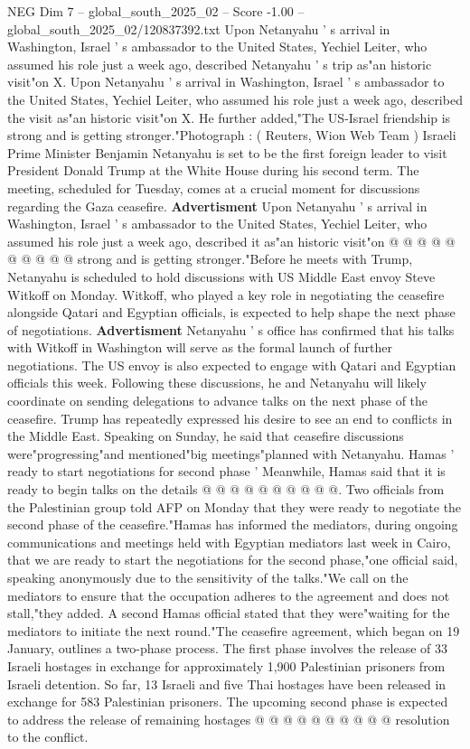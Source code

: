 \begin{textsample}{NEG Dim 7 – global\_south\_2025\_02 – Score -1.00 – global\_south\_2025\_02/120837392.txt}  \label{ex:f7_neg_035}
Upon Netanyahu ' s arrival in Washington, Israel ' s ambassador to the United States, Yechiel Leiter, who assumed his role just a week ago, described Netanyahu ' s trip as"an historic visit"on X.
Upon Netanyahu ' s arrival in Washington, Israel ' s ambassador to the United States, Yechiel Leiter, who assumed his role just a week ago, described the visit as"an historic visit"on X.
He further added,"The US-Israel friendship is strong and is getting stronger."Photograph : ( Reuters, Wion Web Team ) Israeli Prime Minister Benjamin Netanyahu is set to be the first foreign leader to visit President Donald Trump at the White House during his second term.
The meeting, scheduled for Tuesday, comes at a crucial moment for discussions regarding the Gaza ceasefire. \textbf{Advertisment} Upon Netanyahu ' s arrival in Washington, Israel ' s ambassador to the United States, Yechiel Leiter, who assumed his role just a week ago, described it as"an historic visit"on @ @ @ @ @ @ @ @ @ @ strong and is getting stronger."Before he meets with Trump, Netanyahu is scheduled to hold discussions with US Middle East envoy Steve Witkoff on Monday.
Witkoff, who played a key role in negotiating the ceasefire alongside Qatari and Egyptian officials, is expected to help shape the next phase of negotiations. \textbf{Advertisment} Netanyahu ' s office has confirmed that his talks with Witkoff in Washington will serve as the formal launch of further negotiations.
The US envoy is also expected to engage with Qatari and Egyptian officials this week.
Following these discussions, he and Netanyahu will likely coordinate on sending delegations to advance talks on the next phase of the ceasefire.
Trump has repeatedly expressed his desire to see an end to conflicts in the Middle East.
Speaking on Sunday, he said that ceasefire discussions were"progressing"and mentioned"big meetings"planned with Netanyahu.
Hamas ' ready to start negotiations for second phase ' Meanwhile, Hamas said that it is ready to begin talks on the details @ @ @ @ @ @ @ @ @ @.
Two officials from the Palestinian group told AFP on Monday that they were ready to negotiate the second phase of the ceasefire."Hamas has informed the mediators, during ongoing communications and meetings held with Egyptian mediators last week in Cairo, that we are ready to start the negotiations for the second phase,"one official said, speaking anonymously due to the sensitivity of the talks."We call on the mediators to ensure that the occupation adheres to the agreement and does not stall,"they added.
A second Hamas official stated that they were"waiting for the mediators to initiate the next round."The ceasefire agreement, which began on 19 January, outlines a two-phase process.
The first phase involves the release of 33 Israeli hostages in exchange for approximately 1,900 Palestinian prisoners from Israeli detention.
So far, 13 Israeli and five Thai hostages have been released in exchange for 583 Palestinian prisoners.
The upcoming second phase is expected to address the release of remaining hostages @ @ @ @ @ @ @ @ @ @ resolution to the conflict.

\end{textsample}
